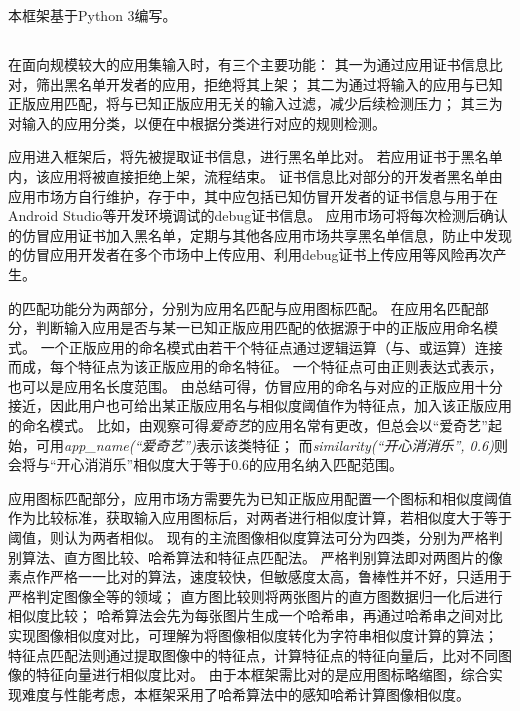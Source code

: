 本框架基于Python 3编写。

\subsection{\componentA }
在面向规模较大的应用集输入时，\componentA 有三个主要功能：
其一为通过应用证书信息比对，筛出黑名单开发者的应用，拒绝将其上架；
其二为通过将输入的应用与已知正版应用匹配，将与已知正版应用无关的输入过滤，减少后续检测压力；
其三为对输入的应用分类，以便在\componentC 中根据分类进行对应的规则检测。

应用进入框架后，将先被提取证书信息，进行黑名单比对。
若应用证书于黑名单内，该应用将被直接拒绝上架，流程结束。
证书信息比对部分的开发者黑名单由应用市场方自行维护，存于\componentD 中，其中应包括已知仿冒开发者的证书信息与用于在Android Studio等开发环境调试的debug证书信息。
应用市场可将每次检测后确认的仿冒应用证书加入黑名单，定期与其他各应用市场共享黑名单信息，防止中发现的仿冒应用开发者在多个市场中上传应用、利用debug证书上传应用等风险再次产生。

\componentA 的匹配功能分为两部分，分别为应用名匹配与应用图标匹配。
在应用名匹配部分，判断输入应用是否与某一已知正版应用匹配的依据源于\componentD 中的正版应用命名模式。
一个正版应用的命名模式由若干个特征点通过逻辑运算（与、或运算）连接而成，每个特征点为该正版应用的命名特征。
一个特征点可由正则表达式表示，也可以是应用名长度范围。
由总结可得，仿冒应用的命名与对应的正版应用十分接近，因此用户也可给出某正版应用名与相似度阈值作为特征点，加入该正版应用的命名模式。
比如，由观察可得\textit{爱奇艺}的应用名常有更改，但总会以``爱奇艺''起始，可用\textit{app\_name(``爱奇艺\*'')}表示该类特征；
而\textit{similarity(``开心消消乐'', 0.6)}则会将与``开心消消乐''相似度大于等于0.6的应用名纳入匹配范围。

应用图标匹配部分，应用市场方需要先为已知正版应用配置一个图标和相似度阈值作为比较标准，\componentA 获取输入应用图标后，对两者进行相似度计算，若相似度大于等于阈值，则认为两者相似。
现有的主流图像相似度算法可分为四类，分别为严格判别算法、直方图比较、哈希算法和特征点匹配法。
严格判别算法即对两图片的像素点作严格一一比对的算法，速度较快，但敏感度太高，鲁棒性并不好，只适用于严格判定图像全等的领域；
直方图比较则将两张图片的直方图数据归一化后进行相似度比较；
哈希算法会先为每张图片生成一个哈希串，再通过哈希串之间对比实现图像相似度对比，可理解为将图像相似度转化为字符串相似度计算的算法；
特征点匹配法则通过提取图像中的特征点，计算特征点的特征向量后，比对不同图像的特征向量进行相似度比对。
由于本框架需比对的是应用图标略缩图，综合实现难度与性能考虑，本框架采用了哈希算法中的感知哈希计算图像相似度。

